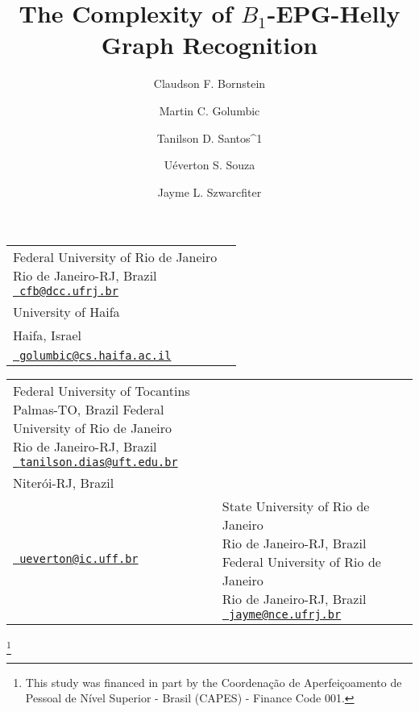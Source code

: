 \documentclass[9pt]{entcs}
\begin{document}
\begin{frontmatter}
  \title{The Complexity of $B_{1}$-EPG-Helly Graph Recognition} 
  
    \begin{tabular}{ p{6cm} p{6cm} }
    \centering   \author{Claudson F.  Bornstein} 
  \address{Federal University of Rio de Janeiro\\
    Rio de Janeiro-RJ, Brazil\\ \href{mailto:cbornstein@gmail.com} {\texttt{\normalshape
        cfb@dcc.ufrj.br}}} & \centering \author{Martin C. Golumbic}
    \address{
    \\ University of Haifa\\   
    Haifa, Israel\\ \href{mailto:golumbic@cs.haifa.ac.il} {\texttt{\normalshape
        golumbic@cs.haifa.ac.il}}}
  \end{tabular}
  \vspace{-1cm}
    \begin{tabular}{ p{5cm} p{5cm} p{5cm} }
    \centering       \author{Tanilson D. Santos^1}
  \address{Federal University of Tocantins\\
    Palmas-TO, Brazil}
    \address{Federal University of Rio de Janeiro\\
    Rio de Janeiro-RJ, Brazil
    \\ \href{mailto:tanilson.dias@uft.edu.br} {\texttt{\normalshape
        tanilson.dias@uft.edu.br}}} & \centering 
        \author{U\'everton S. Souza}
   \address{
Fluminense Federal University\\
    Niter\'oi-RJ, Brazil\\
    \href{mailto:ueverton@ic.uff.br} {\texttt{\normalshape
        ueverton@ic.uff.br}}} & 
    \centering 
    \author{Jayme L.  Szwarcfiter}
     \address{ State University of Rio de Janeiro\\ 
    Rio de Janeiro-RJ, Brazil\vspace{0.23cm} }
    \address{Federal University of Rio de Janeiro\\
    Rio de Janeiro-RJ, Brazil
    \\ \href{mailto:jayme@nce.ufrj.br} {\texttt{\normalshape
        jayme@nce.ufrj.br}}}
  \end{tabular} 
  
    \thanks[1]{This study was financed in part by the Coordena{\c c}\~ao de Aperfei{\c c}oamento de Pessoal de N\'ivel Superior - Brasil (CAPES) - Finance Code 001.}    
    




\end{frontmatter}
\end{document}
